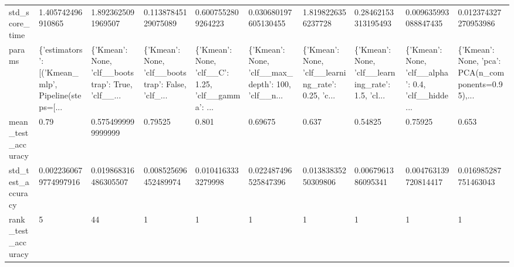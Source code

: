 \begin{tabular}{llllllllll}
std\_score\_time              &                                  1.405742496910865 &                                 1.8923625091969507 &                                0.11387845129075089 &                                 0.6007552809264223 &                               0.030680197605130455 &                                 1.8198226356237728 &                                0.28462153313195493 &                               0.009635993088847435 &                               0.012374327270953986 \\
params                      &  \{'estimators': [('Kmean\_mlp', Pipeline(steps=[... &  \{'Kmean': None, 'clf\_\_bootstrap': True, 'clf\_\_... &  \{'Kmean': None, 'clf\_\_bootstrap': False, 'clf\_... &  \{'Kmean': None, 'clf\_\_C': 1.25, 'clf\_\_gamma': ... &  \{'Kmean': None, 'clf\_\_max\_depth': 100, 'clf\_\_n... &  \{'Kmean': None, 'clf\_\_learning\_rate': 0.25, 'c... &  \{'Kmean': None, 'clf\_\_learning\_rate': 1.5, 'cl... &  \{'Kmean': None, 'clf\_\_alpha': 0.4, 'clf\_\_hidde... &  \{'Kmean': None, 'pca': PCA(n\_components=0.95),... \\
mean\_test\_accuracy          &                                               0.79 &                                 0.5754999999999999 &                                            0.79525 &                                              0.801 &                                            0.69675 &                                              0.637 &                                            0.54825 &                                            0.75925 &                                              0.653 \\
std\_test\_accuracy           &                              0.0022360679774997916 &                               0.019868316486305507 &                               0.008525696452489974 &                                 0.0104163333279998 &                               0.022487496525847396 &                                0.01383835250309806 &                                 0.0067961386095341 &                               0.004763139720814417 &                               0.016985287751463043 \\
rank\_test\_accuracy          &                                                  5 &                                                 44 &                                                  1 &                                                  1 &                                                  1 &                                                  1 &                                                  1 &                                                  1 &                                                  1 \\

\end{tabular}
